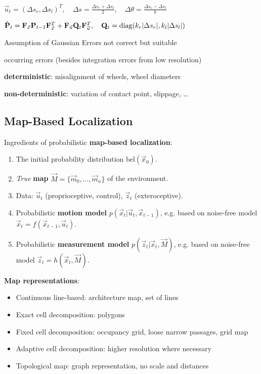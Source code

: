 \documentclass[fontsize=6pt]{scrartcl}
\newcommand{\mat}[1]{\mathbf{#1}}
\begin{document}
\begin{multicols*}{4}
{$ \vec u_t = (\Delta s_r, \Delta s_l)^T, \quad \Delta s = \frac{\Delta s_r + \Delta s_l}{2}, \quad \Delta \theta = \frac{\Delta s_r - \Delta s_l}{b}$

$ \hat{\mat P}_t = 
\mat F_{\vec x} \mat P_{t-1} \mat F_{\vec x}^T 
+ 
\mat F_{\vec u} \mat Q_{t} \mat F_{\vec u}^T
,\quad
\mat Q_t = \diag(k_r|\Delta s_r|, k_l|\Delta s_l|)
$

\par}

Assumption of Gaussian Errors not correct but suitable

occurring errors (besides integration errors from low resolution)

\textbf{deterministic}: misalignment of wheels, wheel diameters

\textbf{non-deterministic}: variation of contact point, slippage, …

\subsection*{Map-Based Localization}
Ingredients of probabilistic \textbf{map-based localization}:
\begin{enumerate}
	\item The initial probability distribution $\text{bel}(\vec x_0)$.
	\item \textit{True} \textbf{map} $\vec M = \{\vec m_0, \ldots, \vec m_n\}$ of the environment.
	\item Data: $\vec u_t$ (proprioceptive, control), $\vec z_t$ (exteroceptive).
	\item Probabilistic \textbf{motion model} $p(\vec x_t|\vec u_t, \vec x_{t-1})$, e.g. based on
	noise-free model $\vec x_t = f(\vec x_{t-1}, \vec u_t)$.
	\item Probabilistic \textbf{measurement model} $p(\vec z_t|\vec x_t,\vec M)$, e.g. based on
	noise-free model $\vec z_t = h(\vec x_t, \vec M)$.
\end{enumerate}

\textbf{Map representations}:
\begin{itemize}
	\item Continuous line-based: architecture map, set of lines
	\item Exact cell decomposition: polygons
	\item Fixed cell decomposition: occupancy grid, loose narrow passages, grid map
	\item Adaptive cell decomposition: higher resolution where necessary
	\item Topological map: graph representation, no scale and distances
\end{itemize}


\end{multicols*}
\end{document}
